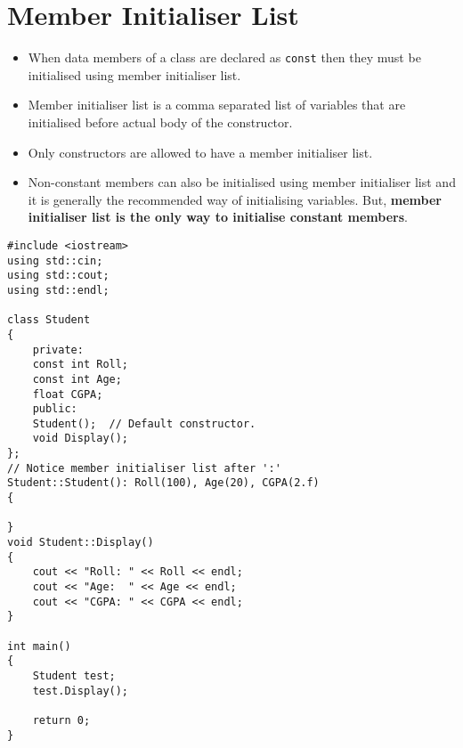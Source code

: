 \documentclass[12pt,a4paper]{article}
\begin{document}
\section{Member Initialiser List}
\begin{itemize}
\item When data members of a class are declared as \verb|const| then they must be initialised using member initialiser list.
\item Member initialiser list is a comma separated list of variables that are initialised before actual body of the constructor.
\item Only constructors are allowed to have a member initialiser list.
\item Non-constant members can also  be initialised using member initialiser list and it is generally the recommended way of initialising variables. But, \textbf{member initialiser list is the only way to initialise constant members}.
\end{itemize}
\begin{lstlisting}[caption={Using member initialiser list to initialise data members}]
#include <iostream>
using std::cin;
using std::cout;
using std::endl;

class Student
{
	private:
	const int Roll;
	const int Age;
	float CGPA;
	public:
	Student();  // Default constructor.
	void Display();
};
// Notice member initialiser list after ':'
Student::Student(): Roll(100), Age(20), CGPA(2.f)
{

}
void Student::Display()
{
	cout << "Roll: " << Roll << endl;
	cout << "Age:  " << Age << endl;
	cout << "CGPA: " << CGPA << endl;
}

int main()
{
	Student test;
	test.Display();

	return 0;
}
\end{lstlisting}
%
%
\end{document}
